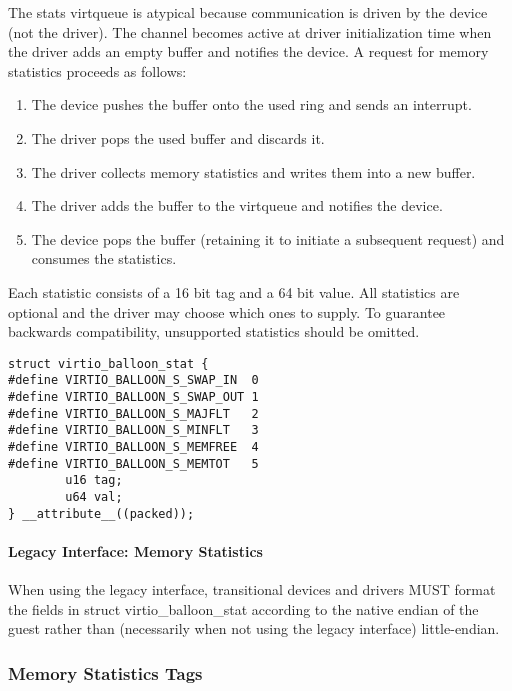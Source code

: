 The stats virtqueue is atypical because communication is driven
by the device (not the driver). The channel becomes active at
driver initialization time when the driver adds an empty buffer
and notifies the device. A request for memory statistics proceeds
as follows:

\begin{enumerate}
\item The device pushes the buffer onto the used ring and sends an
  interrupt.

\item The driver pops the used buffer and discards it.

\item The driver collects memory statistics and writes them into a
  new buffer.

\item The driver adds the buffer to the virtqueue and notifies the
  device.

\item The device pops the buffer (retaining it to initiate a
  subsequent request) and consumes the statistics.
\end{enumerate}

  Each statistic consists of a 16 bit
  tag and a 64 bit value. All statistics are optional and the
  driver may choose which ones to supply. To guarantee backwards
  compatibility, unsupported statistics should be omitted.

\begin{lstlisting}
struct virtio_balloon_stat {
#define VIRTIO_BALLOON_S_SWAP_IN  0
#define VIRTIO_BALLOON_S_SWAP_OUT 1
#define VIRTIO_BALLOON_S_MAJFLT   2
#define VIRTIO_BALLOON_S_MINFLT   3
#define VIRTIO_BALLOON_S_MEMFREE  4
#define VIRTIO_BALLOON_S_MEMTOT   5
        u16 tag;
        u64 val;
} __attribute__((packed));
\end{lstlisting}

\paragraph{Legacy Interface: Memory Statistics}\label{sec:Device Types / Memory Balloon Device / Device Operation / Memory Statistics / Legacy Interface: Memory Statistics}
When using the legacy interface, transitional devices and drivers
MUST format the fields in struct virtio_balloon_stat
according to the native endian of the guest rather than
(necessarily when not using the legacy interface) little-endian.

\subsubsection{Memory Statistics Tags}\label{sec:Device Types / Memory Balloon Device / Device Operation / Memory Statistics Tags}

